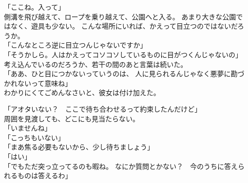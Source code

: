 \documentclass[../IHMain]{subfiles}
\begin{document}
「ここね。入って」\\
側溝を飛び越えて、ロープを乗り越えて、公園へと入る。
あまり大きな公園ではなく、遊具も少ない。
こんな場所にいれば、かえって目立つのではないだろうか。\\
「こんなところ逆に目立つんじゃないですか」\\
「そうかしら。人はかえってコソコソしているものに目がつくんじゃないの」\\
考え込んでいるのだろうか、若干の間のあと言葉は続いた。\\
「ああ、ひと目につかないっていうのは、
人に見られるんじゃなく悪夢に勘づかれないって意味ね」\\
わかりにくてごめんなさいと、彼女は付け加えた。

「アオタいない？　ここで待ち合わせるって約束したんだけど」\\
周囲を見渡しても、どこにも見当たらない。\\
「いませんね」\\
「こっちもいない」\\
「まあ焦る必要もないから、少し待ちましょう」\\
「はい」\\
「でもただ突っ立ってるのも暇ね。
なにか質問とかない？　今のうちに答えられるものは答えるわ」\\
\end{document}
